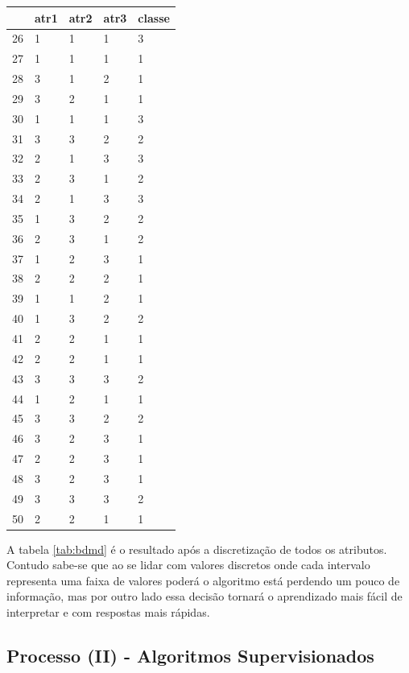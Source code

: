 \begin{table}[!ht]
\begin{tabular}{ |lllll| }
\hline
  & atr1 & atr2 & atr3 & classe \\ \hline
26	&	1	&	1	&	1	&	3	\\	\hline
27	&	1	&	1	&	1	&	1	\\	\hline
28	&	3	&	1	&	2	&	1	\\	\hline
29	&	3	&	2	&	1	&	1	\\	\hline
30	&	1	&	1	&	1	&	3	\\	\hline
31	&	3	&	3	&	2	&	2	\\	\hline
32	&	2	&	1	&	3	&	3	\\	\hline
33	&	2	&	3	&	1	&	2	\\	\hline
34	&	2	&	1	&	3	&	3	\\	\hline
35	&	1	&	3	&	2	&	2	\\	\hline
36	&	2	&	3	&	1	&	2	\\	\hline
37	&	1	&	2	&	3	&	1	\\	\hline
38	&	2	&	2	&	2	&	1	\\	\hline
39	&	1	&	1	&	2	&	1	\\	\hline
40	&	1	&	3	&	2	&	2	\\	\hline
41	&	2	&	2	&	1	&	1	\\	\hline
42	&	2	&	2	&	1	&	1	\\	\hline
43	&	3	&	3	&	3	&	2	\\	\hline
44	&	1	&	2	&	1	&	1	\\	\hline
45	&	3	&	3	&	2	&	2	\\	\hline
46	&	3	&	2	&	3	&	1	\\	\hline
47	&	2	&	2	&	3	&	1	\\	\hline
48	&	3	&	2	&	3	&	1	\\	\hline
49	&	3	&	3	&	3	&	2	\\	\hline
50	&	2	&	2	&	1	&	1	\\	\hline

\end{tabular}
\end{table}

A tabela \ref{tab:bdmd} é o resultado após a discretização de todos os atributos. Contudo sabe-se que ao se lidar com valores discretos onde cada intervalo representa uma faixa de valores poderá o algoritmo está perdendo um pouco de informação, mas por outro lado essa decisão tornará o aprendizado mais fácil de interpretar e com respostas mais rápidas.

\subsection{Processo (II) - Algoritmos Supervisionados}\label{ssec:algsuper}

